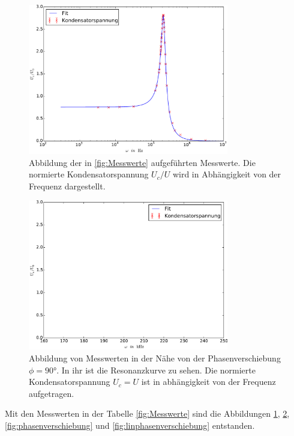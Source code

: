 \begin{figure}
  \centering
  \includegraphics[width=0.78\textwidth]{Kondensatorspannung.pdf}
  \caption{Abbildung der in \ref{fig:Messwerte} aufgeführten Messwerte.
  Die normierte Kondensatorspannung $U_c/U$ wird in Abhängigkeit von der
  Frequenz dargestellt.}
  \label{fig:Kondensatorspannung}
\end{figure}
\begin{figure}
  \centering
  \includegraphics[width=0.78\textwidth]{Resonanzkurve.pdf}
  \caption{Abbildung von Messwerten in der Nähe von der Phasenverschiebung $\phi=90°$.
  In ihr ist die Resonanzkurve zu sehen. Die normierte Kondensatorspannung $U_c=U$
  ist in abhängigkeit von der Frequenz aufgetragen.}
  \label{fig:Resonanzkurve}
\end{figure}
Mit den Messwerten in der Tabelle \ref{fig:Messwerte} sind die  Abbildungen
\ref{fig:Kondensatorspannung}, \ref{fig:Resonanzkurve},
\ref{fig:phasenverschiebung} und \ref{fig:linphasenverschiebung}
entstanden.
